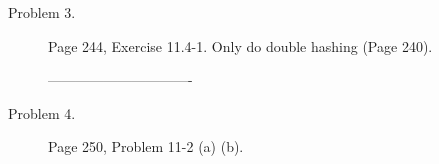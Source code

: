 \documentclass[11pt]{article}
\begin{document}
\begin{description}
\begin{comment}
\end{comment}

\item[Problem 3.]
Page 244, Exercise 11.4-1. Only do double hashing (Page 240).

\begin{comment}-------------------------------

\noindent \textbf{Solution:}

((10 mod 11) + 0*(1+ (10 mod 10))) mode 11 = 10

((22 mod 11) + 0*(1+ (22 mod 10))) mode 11 = 0

((31 mod 11) + 0*(1+ (31 mod 10))) mode 11 = 9

((4 mod 11) + 0*(1+ (4 mod 10))) mode 11 = 4

((15 mod 11) + 0*(1+ (15 mod 10))) mode 11 = 4, collision

((15 mod 11) + 1*(1+ (15 mod 10))) mode 11 = 10, collision

((15 mod 11) + 2*(1+ (15 mod 10))) mode 11 = 5

((28 mod 11) + 0*(1+ (28 mod 10))) mode 11 = 6

((17 mod 11) + 0*(1+ (17 mod 10))) mode 11 = 6, collision

((17 mod 11) + 1*(1+ (17 mod 10))) mode 11 = 3

((88 mod 11) + 0*(1+ (88 mod 10))) mode 11 = 0, collision

((88 mod 11) + 1*(1+ (88 mod 10))) mode 11 = 9, collision

((88 mod 11) + 2*(1+ (88 mod 10))) mode 11 = 7

((59 mod 11) + 0*(1+ (59 mod 10))) mode 11 = 4, collision

((59 mod 11) + 1*(1+ (59 mod 10))) mode 11 = 3, collision

((59 mod 11) + 2*(1+ (59 mod 10))) mode 11 = 2

\end{comment}-------------------------------





\item[Problem 4.]
Page 250, Problem 11-2 (a) (b).

\begin{comment}-------------------------------

\noindent \textbf{Solution:}

(a). Note that here the table size is $n$. A given key is hashed to a chosen
slot with probability $1/n$. For a given slot, if we choose $k$ keys, then the
probability that all of them are hashed into that slot and all other other keys
are hashed to other slots is: $(1/n)^k(1-1/n)^{(n-k)}$. As there are
$C^{n}_{k}$ possibilities, thus, we get:
$$
C^{n}_{k} (1/n)^k(1-1/n)^{(n-k)}.
$$



\end{comment}
\end{description}
\end{document}
